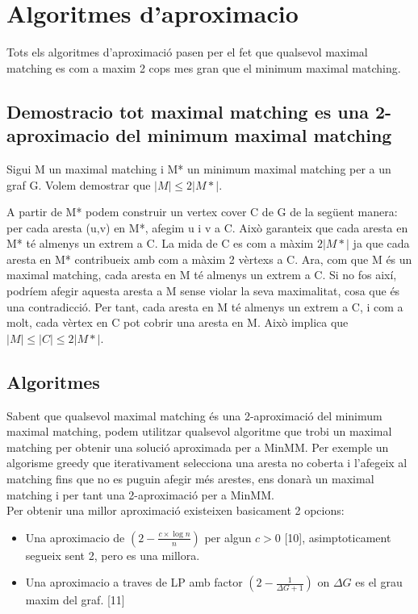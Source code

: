 \section{Algoritmes d'aproximacio}
Tots els algoritmes d'aproximació pasen per el fet que qualsevol maximal matching es com a maxim 2 cops mes gran que el minimum maximal matching.
\subsection{Demostracio tot maximal matching es una 2-aproximacio del minimum maximal matching}

Sigui M un maximal matching i M* un minimum maximal matching per a un graf G.
Volem demostrar que $|M| \le 2|M*|$.

A partir de M* podem construir un vertex cover C de G de la següent manera: per cada aresta (u,v) en M*, afegim u i v a C. Això garanteix que cada aresta en M* té almenys un extrem a C.
La mida de C es com a màxim $2|M*|$ ja que cada aresta en M* contribueix amb com a màxim 2 vèrtexs a C.
Ara, com que M és un maximal matching, cada aresta en M té almenys un extrem a C. Si no fos així, podríem afegir aquesta aresta a M sense violar la seva maximalitat, cosa que és una contradicció.
Per tant, cada aresta en M té almenys un extrem a C, i com a molt, cada vèrtex en C pot cobrir una aresta en M. Això implica que $|M| \le |C| \le 2|M*|$.

\subsection{Algoritmes}
Sabent que qualsevol maximal matching és una 2-aproximació del minimum maximal matching, podem utilitzar qualsevol algoritme que trobi un maximal matching per obtenir una solució aproximada per a MinMM.
Per exemple un algorisme greedy que iterativament selecciona una aresta no coberta i l'afegeix al matching fins que no es puguin afegir més arestes, ens donarà un maximal matching i per tant una 2-aproximació per a MinMM.\\
Per obtenir una millor aproximació existeixen basicament 2 opcions:
\begin{itemize}
    \item Una aproximacio de $(2 - \frac {c \times \log n} {n} )$ per algun $c > 0$ [10], asimptoticament segueix sent 2, pero es una millora.
    \item Una aproximacio a traves de LP amb factor $(2 - \frac {1} {\Delta G + 1})$ on $\Delta G$ es el grau maxim del graf. [11]
\end{itemize}

